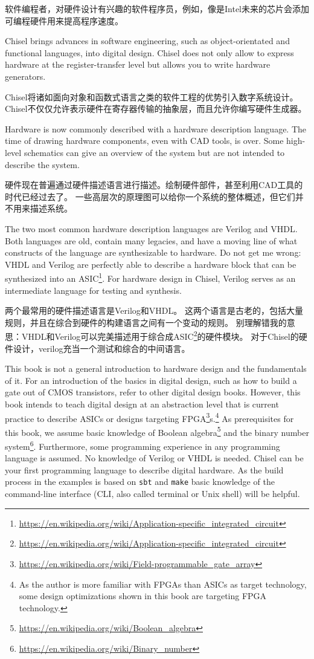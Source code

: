 \documentclass[%
    10pt,
    headinclude, footexclude,
    openright, %
    notitlepage,
    cleardoubleempty,
    headsepline,
    pointlessnumbers,
    bibtotoc, idxtotoc,
    ]{scrbook}
\newcommand{\code}[1]{{\small{\texttt{#1}}}}
\newcommand{\myref}[2]{\href{#1}{#2}}
\renewcommand{\myref}[2]{{#2}{\footnote{\url{#1}}}}
\begin{document}
软件编程者，对硬件设计有兴趣的软件程序员，例如，像是Intel未来的芯片会添加可编程硬件用来提高程序速度。


Chisel brings advances in software engineering, such as object-orientated
and functional languages, into digital design.
Chisel does not only allow to express hardware at the register-transfer level
but allows you to write hardware generators.

Chisel将诸如面向对象和函数式语言之类的软件工程的优势引入数字系统设计。
Chisel不仅仅允许表示硬件在寄存器传输的抽象层，而且允许你编写硬件生成器。

Hardware is now commonly described with a hardware description language.
The time of drawing hardware components, even with CAD tools, is
over. Some high-level schematics can give an overview of the system but are
not intended to describe the system.

硬件现在普遍通过硬件描述语言进行描述。绘制硬件部件，甚至利用CAD工具的时代已经过去了。
一些高层次的原理图可以给你一个系统的整体概述，但它们并不用来描述系统。

The two most common hardware description languages are Verilog and VHDL.
Both languages are old, contain many legacies, and have a moving line of what
constructs of the language are synthesizable to hardware.
Do not get me wrong: VHDL and Verilog are perfectly able to describe a hardware
block that can be synthesized into an
\myref{https://en.wikipedia.org/wiki/Application-specific_integrated_circuit}{ASIC}.
For hardware design in Chisel, Verilog serves as an intermediate language
for testing and synthesis.

两个最常用的硬件描述语言是Verilog和VHDL。
这两个语言是古老的，包括大量规则，并且在综合到硬件的构建语言之间有一个变动的规则。
别理解错我的意思：VHDL和Verilog可以完美描述用于综合成\myref{https://en.wikipedia.org/wiki/Application-specific_integrated_circuit}{ASIC}的硬件模块。
对于Chisel的硬件设计，verilog充当一个测试和综合的中间语言。

This book is not a general introduction to hardware design and the fundamentals of it.
For an introduction of the basics in digital design, such as how to build a gate out of
CMOS transistors, refer to other digital design books.
However, this book intends to teach digital design at an abstraction level that is
current practice to describe ASICs or designs targeting
\myref{https://en.wikipedia.org/wiki/Field-programmable_gate_array}{FPGA}s.\footnote{As the author is more familiar with FPGAs
than ASICs as target technology, some design optimizations shown in this book are
targeting FPGA technology.}
As prerequisites for this book, we assume basic knowledge of
\myref{https://en.wikipedia.org/wiki/Boolean_algebra}{Boolean algebra} and the
\myref{https://en.wikipedia.org/wiki/Binary_number}{binary number system}.
Furthermore, some programming experience in any programming language
is assumed. No knowledge of Verilog or VHDL is needed.
Chisel can be your first programming language to describe digital hardware.
As the build process in the examples is based on \code{sbt} and \code{make}
basic knowledge of the command-line interface (CLI, also called terminal or
Unix shell) will be helpful.
\end{document}
